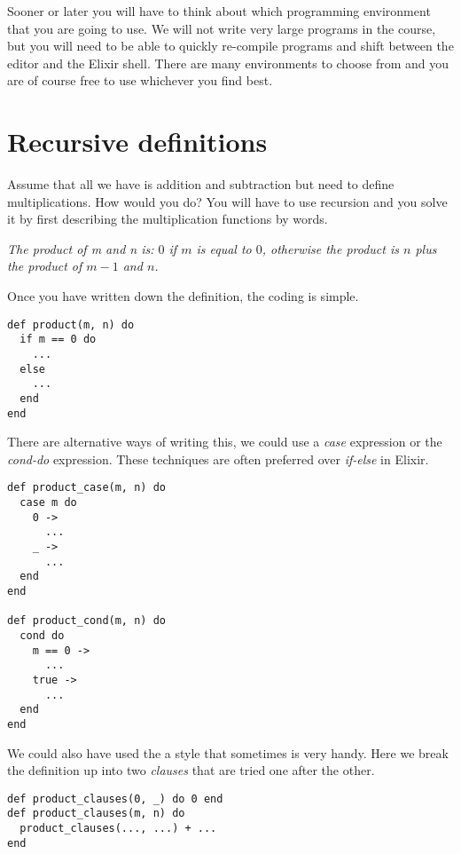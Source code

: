 \documentclass[a4paper,11pt]{article}
\begin{document}
Sooner or later you will have to think about which programming
environment that you are going to use. We will not write very large
programs in the course, but you will need to be able to quickly
re-compile programs and shift between the editor and the Elixir
shell. There are many environments to choose from and you are of course
free to use whichever you find best.



\section{Recursive definitions}

Assume that all we have is addition and subtraction but need to define
multiplications. How would you do? You will have to use recursion and
you solve it by first describing the multiplication functions by words.

{\em The product of m and n is: $0$ if $m$ is equal to $0$, otherwise the
  product is $n$ plus the product of $m-1$ and $n$.}

Once you have written down the definition, the coding is simple.

\begin{verbatim}
def product(m, n) do
  if m == 0 do
    ...
  else
    ...
  end
end
\end{verbatim}

There are alternative ways of writing this, we could use a {\em case}
  expression or the {\em cond-do} expression. These techniques are often
  preferred over {\em if-else} in Elixir.
  
\begin{verbatim}
def product_case(m, n) do
  case m do
    0 ->
      ...
    _ ->
      ...
  end
end

def product_cond(m, n) do
  cond do
    m == 0 ->
      ...
    true ->
      ...
  end
end
\end{verbatim}

We could also have used the a style that sometimes is very handy. Here
we break the definition up into two {\em clauses} that are tried one
after the other.

\begin{verbatim}
def product_clauses(0, _) do 0 end
def product_clauses(m, n) do
  product_clauses(..., ...) + ...
end
\end{verbatim}
\end{document}
